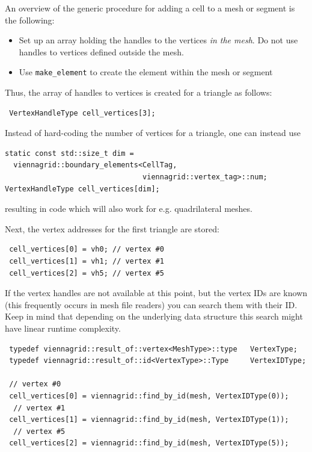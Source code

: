 

An overview of the generic procedure for adding a cell to a mesh or segment is the following:
  \begin{itemize}
   \item Set up an array holding the handles to the vertices \emph{in the mesh}. Do not use handles to vertices defined outside the mesh.
   \item Use \lstinline|make_element| to create the element within the mesh or segment
  \end{itemize}
Thus, the array of handles to vertices is created for a triangle as follows:
\begin{lstlisting}
 VertexHandleType cell_vertices[3];
\end{lstlisting}
Instead of hard-coding the number of vertices for a triangle, one can instead use
\begin{lstlisting}
static const std::size_t dim =
  viennagrid::boundary_elements<CellTag,
                                viennagrid::vertex_tag>::num;
VertexHandleType cell_vertices[dim];
\end{lstlisting}
resulting in code which will also work for e.g. quadrilateral meshes.


Next, the vertex addresses for the first triangle are stored:
\begin{lstlisting}
 cell_vertices[0] = vh0; // vertex #0
 cell_vertices[1] = vh1; // vertex #1
 cell_vertices[2] = vh5; // vertex #5
\end{lstlisting}


If the vertex handles are not available at this point, but the vertex IDs are known (this frequently occurs in mesh file readers) you can search them with their ID.
Keep in mind that depending on the underlying data structure this search might have linear runtime complexity.
\begin{lstlisting}
 typedef viennagrid::result_of::vertex<MeshType>::type   VertexType;
 typedef viennagrid::result_of::id<VertexType>::Type     VertexIDType;

 // vertex #0
 cell_vertices[0] = viennagrid::find_by_id(mesh, VertexIDType(0));
  // vertex #1
 cell_vertices[1] = viennagrid::find_by_id(mesh, VertexIDType(1));
  // vertex #5
 cell_vertices[2] = viennagrid::find_by_id(mesh, VertexIDType(5));
\end{lstlisting}

